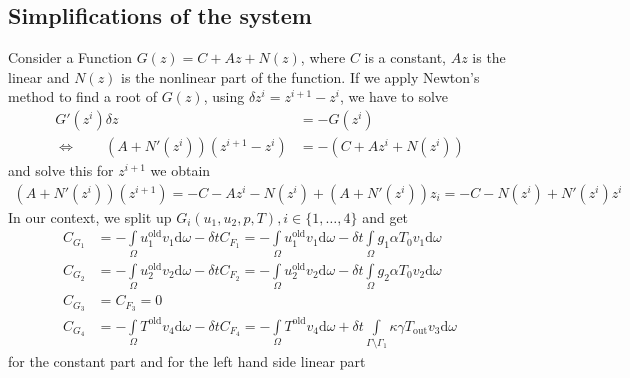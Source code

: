 \documentclass{article}
\begin{document}
\subsection{Simplifications of the system}
Consider a Function $G(z) = C + Az + N(z)$, where $C$ is a constant, $Az$ is the linear and $N(z)$ is the nonlinear part of the function. If we apply Newton's method to find a root of $G(z)$, using $\delta z^i = z^{i+1}-z^{i}$, we have to solve
\begin{align*}
G'(z^i)\delta z &= -G(z^i) \\
\Leftrightarrow  \qquad (A+N'(z^i))(z^{i+1}-z^i) &= -\left(C + Az^i + N(z^i)\right)
\end{align*}
and solve this for $z^{i+1}$ we obtain
\begin{align*}
(A+N'(z^i))(z^{i+1}) = -C - Az^i - N(z^i) +(A+N'(z^i))z_i = -C-N(z^i) + N'(z^i)z^i
\end{align*}
In our context, we split up $G_i(u_1,u_2,p,T),i\in \{1,\dots,4\}$ and get
\begin{align*}
C_{G_1} &= -\int\limits_{\Omega}u_1^\text{old}v_1\text{d}\omega-\delta tC_{F_1} =-\int\limits_{\Omega}u_1^\text{old}v_1\text{d}\omega -\delta t\int\limits_\Omega g_1\alpha T_0 v_1 \text{d}\omega \\
C_{G_2} &= -\int\limits_{\Omega}u_2^\text{old}v_2\text{d}\omega-\delta tC_{F_2} =-\int\limits_{\Omega}u_2^\text{old}v_2\text{d}\omega -\delta t\int\limits_\Omega g_2\alpha T_0 v_2 \text{d}\omega \\
C_{G_3} &= C_{F_3} = 0 \\
C_{G_4} &= -\int\limits_{\Omega}T^\text{old}v_4\text{d}\omega-\delta tC_{F_4} =-\int\limits_{\Omega}T^\text{old}v_4\text{d}\omega + \delta t\int\limits_{\Gamma\setminus\Gamma_1} \kappa\gamma T_\text{out} v_3\text{d}\omega
\end{align*}
for the constant part and for the left hand side linear part
\end{document}
